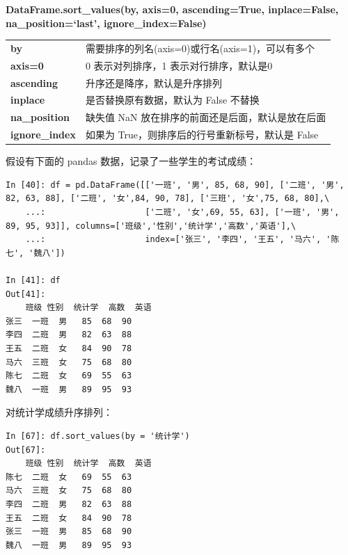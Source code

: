 \begin{center}
\begin{tcolorbox}[title = sort\_values 的一般语法]
\textbf{DataFrame.sort\_values(by, axis=0, ascending=True, inplace=False,  na\_position=`last', ignore\_index=False)}
\tcblower
\vspace{10pt}

\begin{tcboutputlisting}
\begin{tabular}{>{\bfseries}ll}
  by & 需要排序的列名(axis=0)或行名(axis=1)，可以有多个\\
  axis=0 & 0 表示对列排序，1 表示对行排序，默认是0\\
ascending & 升序还是降序，默认是升序排列\\
inplace & 是否替换原有数据，默认为 False 不替换 \\
na\_position&缺失值 NaN 放在排序的前面还是后面，默认是放在后面\\
ignore\_index & 如果为 True，则排序后的行号重新标号，默认是 False
\end{tabular}
\end{tcboutputlisting}
\tcbuselistingtext
\end{tcolorbox}
\end{center}

假设有下面的 pandas 数据，记录了一些学生的考试成绩：

\begin{lstlisting}[Language=Python]
In [40]: df = pd.DataFrame([['一班', '男', 85, 68, 90], ['二班', '男', 82, 63, 88], ['二班', '女',84, 90, 78], ['三班', '女',75, 68, 80],\
    ...:                    ['二班', '女',69, 55, 63], ['一班', '男', 89, 95, 93]], columns=['班级','性别','统计学','高数','英语'],\
    ...:                    index=['张三', '李四', '王五', '马六', '陈七', '魏八'])

In [41]: df
Out[41]:
    班级 性别  统计学  高数  英语
张三  一班  男   85  68  90
李四  二班  男   82  63  88
王五  二班  女   84  90  78
马六  三班  女   75  68  80
陈七  二班  女   69  55  63
魏八  一班  男   89  95  93

\end{lstlisting}


对统计学成绩升序排列：

\begin{lstlisting}[Language=Python]
In [67]: df.sort_values(by = '统计学')
Out[67]:
    班级 性别  统计学  高数  英语
陈七  二班  女   69  55  63
马六  三班  女   75  68  80
李四  二班  男   82  63  88
王五  二班  女   84  90  78
张三  一班  男   85  68  90
魏八  一班  男   89  95  93
\end{lstlisting}


